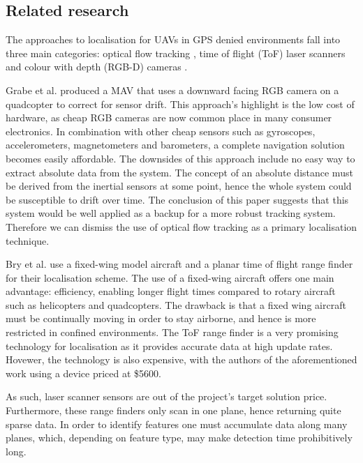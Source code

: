 \documentclass[]{article}
\begin{document}
{\subsection{Related research} %
\label{sub:related_works}
The approaches to localisation for UAVs in GPS denied environments fall into three main categories: optical flow tracking \cite{DBLP:conf/icra/GrabeBG12}, time of flight (ToF) laser scanners \cite{Bry2012} and colour with depth (RGB-D) cameras \cite{Shen2012}.

Grabe et al. \cite{DBLP:conf/icra/GrabeBG12} produced a MAV that uses a downward facing RGB camera on a quadcopter to correct for sensor drift. This approach's highlight is the low cost of hardware, as cheap RGB cameras are now common place in many consumer electronics. In combination with other cheap sensors such as gyroscopes, accelerometers, magnetometers and barometers, a complete navigation solution becomes easily affordable. The downsides of this approach include no easy way to extract absolute data from the system. The concept of an absolute distance must be derived from the inertial sensors at some point, hence the whole system could be susceptible to drift over time. The conclusion of this paper suggests that this system would be well applied as a backup for a more robust tracking system. Therefore we can dismiss the use of optical flow tracking as a primary localisation technique. 

Bry et al. \cite{Bry2012} use a fixed-wing model aircraft and a planar time of flight range finder for their localisation scheme. The use of a fixed-wing aircraft offers one main advantage: efficiency, enabling longer flight times compared to rotary aircraft such as helicopters and quadcopters. The drawback is that a fixed wing aircraft must be continually moving in order to stay airborne, and hence is more restricted in confined environments. The ToF range finder is a very promising technology for localisation as it provides accurate data at high update rates. Hovewer, the technology is also expensive, with the authors of the aforementioned work using a device priced at \$5600.

As such, laser scanner sensors are out of the project's target solution price. Furthermore, these range finders only scan in one plane, hence returning quite sparse data. In order to identify features one must accumulate data along many planes, which, depending on feature type, may make detection time prohibitively long. 

}
\end{document}
